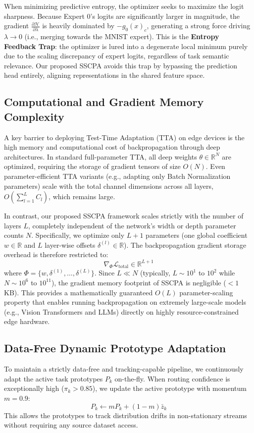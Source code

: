 \documentclass{article}
\theoremstyle{plain}
\theoremstyle{definition}
\theoremstyle{remark}
\begin{document}
When minimizing predictive entropy, the optimizer seeks to maximize the logit sharpness. Because Expert 0's logits are significantly larger in magnitude, the gradient $\frac{\partial \mathcal{H}}{\partial \lambda}$ is heavily dominated by $-g_0(x)_c$, generating a strong force driving $\lambda \to 0$ (i.e., merging towards the MNIST expert). This is the \textbf{Entropy Feedback Trap}: the optimizer is lured into a degenerate local minimum purely due to the scaling discrepancy of expert logits, regardless of task semantic relevance. Our proposed SSCPA avoids this trap by bypassing the prediction head entirely, aligning representations in the shared feature space.

\subsection{Computational and Gradient Memory Complexity}
A key barrier to deploying Test-Time Adaptation (TTA) on edge devices is the high memory and computational cost of backpropagation through deep architectures. In standard full-parameter TTA, all deep weights $\theta \in \mathbb{R}^N$ are optimized, requiring the storage of gradient tensors of size $O(N)$. Even parameter-efficient TTA variants (e.g., adapting only Batch Normalization parameters) scale with the total channel dimensions across all layers, $O(\sum_{l=1}^L C_l)$, which remains large.

In contrast, our proposed SSCPA framework scales strictly with the number of layers $L$, completely independent of the network's width or depth parameter counts $N$. Specifically, we optimize only $L+1$ parameters (one global coefficient $w \in \mathbb{R}$ and $L$ layer-wise offsets $\delta^{(l)} \in \mathbb{R}$). The backpropagation gradient storage overhead is therefore restricted to:
\begin{equation}
    \nabla_{\Phi} \mathcal{L}_{\text{total}} \in \mathbb{R}^{L+1}
\end{equation}
where $\Phi = \{w, \delta^{(1)}, \dots, \delta^{(L)}\}$. Since $L \ll N$ (typically, $L \sim 10^1$ to $10^2$ while $N \sim 10^6$ to $10^{11}$), the gradient memory footprint of SSCPA is negligible ($<1$ KB). This provides a mathematically guaranteed $O(L)$ parameter-scaling property that enables running backpropagation on extremely large-scale models (e.g., Vision Transformers and LLMs) directly on highly resource-constrained edge hardware.

\subsection{Data-Free Dynamic Prototype Adaptation}
To maintain a strictly data-free and tracking-capable pipeline, we continuously adapt the active task prototypes $P_k$ on-the-fly. When routing confidence is exceptionally high ($\pi_k > 0.85$), we update the active prototype with momentum $m = 0.9$:
\begin{equation}
    P_k \leftarrow m P_k + (1-m) \bar{z}_k
\end{equation}
This allows the prototypes to track distribution drifts in non-stationary streams without requiring any source dataset access.
\end{document}
